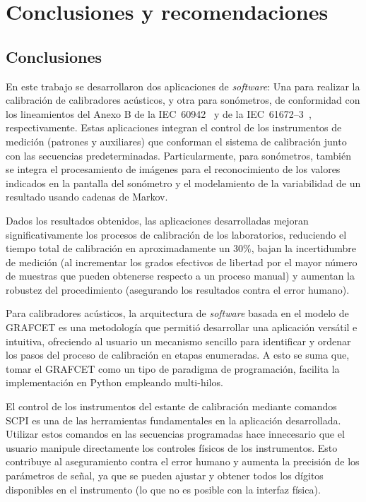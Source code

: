
\chapter{Conclusiones y recomendaciones}
\section{Conclusiones}
En este trabajo se desarrollaron dos aplicaciones de \emph{software}: Una para realizar la calibración de calibradores
acústicos, y otra para sonómetros, de conformidad con los lineamientos del Anexo B de la \mbox{IEC 60942}~\citeyearpar{IEC_TC29_2017}
y de la \mbox{IEC 61672--3}~\citeyearpar{IEC_TC29_2013_3}, respectivamente.
Estas aplicaciones integran el control de los instrumentos de medición (patrones y auxiliares) que conforman el sistema de
calibración junto con las secuencias predeterminadas.
Particularmente, para sonómetros, también se integra el procesamiento de imágenes para el reconocimiento de los valores
indicados en la pantalla del sonómetro y el modelamiento de la variabilidad de un resultado usando cadenas de Markov.

Dados los resultados obtenidos, las aplicaciones desarrolladas mejoran significativamente los procesos
de calibración de los laboratorios, reduciendo el tiempo total de calibración en aproximadamente un $30\%$,
bajan la incertidumbre de medición (al incrementar los grados efectivos de libertad por el mayor número de muestras que
pueden obtenerse respecto a un proceso manual) y aumentan la robustez del procedimiento (asegurando los resultados contra
el error humano).

Para calibradores acústicos, la arquitectura de \emph{software} basada en el modelo de GRAFCET es una metodología
que permitió desarrollar una aplicación versátil e intuitiva, ofreciendo al usuario un mecanismo sencillo para identificar
y ordenar los pasos del proceso de calibración en etapas enumeradas.
A esto se suma que, tomar el GRAFCET como un tipo de paradigma de programación, facilita la implementación en Python
empleando multi-hilos.

El control de los instrumentos del estante de calibración mediante comandos SCPI es una de las herramientas fundamentales
en la aplicación desarrollada.
Utilizar estos comandos en las secuencias programadas hace innecesario que el usuario manipule directamente los controles
físicos de los instrumentos.
Esto contribuye al aseguramiento contra el error humano y aumenta la precisión de los parámetros de señal, ya que se pueden
ajustar y obtener todos los dígitos disponibles en el instrumento (lo que no es posible con la interfaz física).

